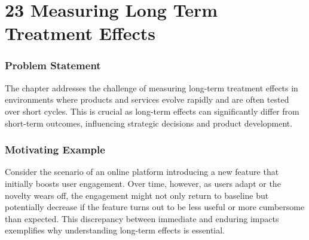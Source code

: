 \documentclass{article}
\begin{document}
\section*{23 Measuring Long Term Treatment Effects}
\subsubsection*{Problem Statement}
The chapter addresses the challenge of measuring long-term treatment effects in environments where products and services evolve rapidly and are often tested over short cycles. This is crucial as long-term effects can significantly differ from short-term outcomes, influencing strategic decisions and product development.

\subsubsection*{Motivating Example}
Consider the scenario of an online platform introducing a new feature that initially boosts user engagement. Over time, however, as users adapt or the novelty wears off, the engagement might not only return to baseline but potentially decrease if the feature turns out to be less useful or more cumbersome than expected. This discrepancy between immediate and enduring impacts exemplifies why understanding long-term effects is essential.
\end{document}
